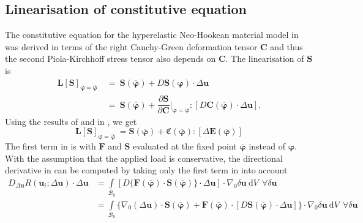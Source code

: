 \subsection{Linearisation of constitutive equation}
The constitutive equation for the hyperelastic Neo-Hookean material model in  was derived in terms of the right Cauchy-Green deformation tensor $\mathbf{C}$ and thus the second Piola-Kirchhoff stress tensor also depends on $\mathbf{C}$. The linearisation of $\mathbf{S}$ is
\begin{align}
\mathbf{L}\left[ \mathbf{S} \right]_{\bm{\varphi} = \overline{\bm{\varphi}}} \ &= \ \mathbf{S}(\overline{\bm{\varphi}}) + D \mathbf{S}(\bm{\varphi}) \cdot \Delta\mathbf{u} \nonumber \\
&= \ \mathbf{S}(\overline{\bm{\varphi}}) + \dfrac{\partial \mathbf{S}}{\partial \mathbf{C}} \Big|_{\bm{\varphi} = \overline{\bm{\varphi}}} : \left[ D \mathbf{C}(\overline{\bm{\varphi}}) \cdot \Delta\mathbf{u} \right].
\label{eq:2.16}
\end{align}
Using the results of  and  in , we get
\begin{equation}
\mathbf{L}\left[ \mathbf{S} \right]_{\bm{\varphi} = \overline{\bm{\varphi}}} \ = \mathbf{S}(\overline{\bm{\varphi}}) + \mathfrak{C}(\overline{\bm{\varphi}}) : \left[ \Delta \mathbf{E}(\overline{\bm{\varphi}}) \right]
\label{eq:2.19}
\end{equation} \newline 
The first term in  is  with $\mathbf{F}$ and $\mathbf{S}$ evaluated at the fixed point $\overline{\bm{\varphi}}$ instead of $\bm{\varphi}$. With the assumption that the applied load is conservative, the directional derivative in  can be computed by taking only the first term in  into account
\begin{align}
D_{\Delta\mathbf{u}} R(\mathbf{u}_i; \Delta \mathbf{u}) \cdot \Delta\mathbf{u} &= \int\limits_{\mathcal{B}_0} \left[ D \{ \mathbf{F}(\overline{\bm{\varphi}}) \cdot \mathbf{S}(\overline{\bm{\varphi}})\} \cdot \Delta\mathbf{u} \right] \cdot \nabla_0 \delta\mathbf{u} \ \mathrm{d}V \ \ \forall \delta\mathbf{u} \nonumber \\
&= \int\limits_{\mathcal{B}_0} \Big\lbrace \nabla_0 (\Delta\mathbf{u}) \cdot \mathbf{S}(\overline{\bm{\varphi}}) + \mathbf{F}(\overline{\bm{\varphi}}) \cdot \left[ D \mathbf{S}(\overline{\bm{\varphi}}) \cdot \Delta\mathbf{u} \right] \Big\rbrace \cdot \nabla_0 \delta\mathbf{u} \ \mathrm{d}V \ \ \forall \delta\mathbf{u}
\label{eq:2.20}
\end{align}
